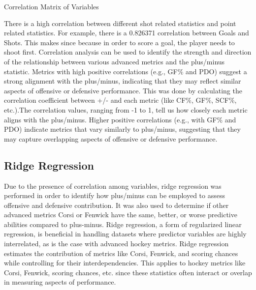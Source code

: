 \documentclass[12pt]{article}
\begin{document}
\begin{table}[h!]
  \centering
  \caption{Correlation Matrix of Variables}
  
  \label{tab:correlation_matrix}
\end{table}

There is a high correlation between different shot related statistics and point related statistics. For example, there is a 
0.826371 correlation between Goals and Shots. This makes since because in order to score a goal, the player needs to shoot first.
Correlation analysis can be used to identify the strength and direction of the relationship between various advanced metrics and 
the plus/minus statistic. Metrics with high positive correlations (e.g., GF\% and PDO) suggest a strong alignment with the plus/minus, 
indicating that they may reflect similar aspects of offensive or defensive performance. This was done by calculating the correlation 
coefficient between +/- and each metric (like CF\%, GF\%, SCF\%, etc.).The correlation values, ranging from -1 to 1, tell us how closely 
each metric aligns with the plus/minus. Higher positive correlations (e.g., with GF\% and PDO) indicate metrics that vary similarly to 
plus/minus, suggesting that they may capture overlapping aspects of offensive or defensive performance.

\subsection{Ridge Regression}

Due to the presence of correlation among variables, ridge regression was performed in order to identify how plus/minus can be employed 
to assess offensive and defensive contribution. It was also used to determine if other advanced metrics Corsi or Fenwick have the same, 
better, or worse predictive abilities compared to plus-minus. Ridge regression, a form of regularized linear regression, is beneficial 
in handling datasets where predictor variables are highly interrelated, as is the case with advanced hockey metrics. Ridge regression 
estimates the contribution of metrics like Corsi, Fenwick, and scoring chances while controlling for their interdependencies. This 
applies to hockey metrics like Corsi, Fenwick, scoring chances, etc. since these statistics often interact or overlap in measuring aspects 
of performance.
\end{document}
